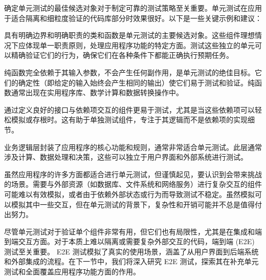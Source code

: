 确定单元测试的最佳候选对象对于制定可靠的测试策略至关重要。单元测试在应用于适合隔离和细粒度验证的代码库部分时效果很好。以下是一些关键示例和建议：

具有明确边界和明确职责的类和函数是单元测试的主要候选对象。这些组件理想情况下应体现单一职责原则，处理应用程序功能的特定方面。测试这些独立的单元可以精确验证它们的行为，确保它们在各种条件下都能正确执行预期任务。

纯函数完全依赖于其输入参数，不会产生任何副作用，是单元测试的绝佳目标。它们的确定性（即给定的输入始终会产生相同的输出）使它们易于测试和验证。纯函数通常出现在实用程序库、数学计算和数据转换操作中。

通过定义良好的接口与依赖项交互的组件更易于测试，尤其是当这些依赖项可以轻松模拟或存根时。这有助于单独测试组件，专注于其逻辑而不是依赖项的实现细节。

业务逻辑层封装了应用程序的核心功能和规则，通常非常适合单元测试。此层通常涉及计算、数据处理和决策，这些可以独立于用户界面和外部系统进行测试。

虽然应用程序的许多方面都适合进行单元测试，但谨慎起见，要认识到会带来挑战的场景。需要与外部资源（如数据库、文件系统和网络服务）进行复杂交互的组件可能难以有效模拟，或者由于依赖外部状态或行为而导致测试不稳定。虽然模拟可以模拟其中一些交互，但在单元测试的背景下，复杂性和开销可能并不总是值得付出努力。

尽管单元测试对于验证单个组件非常有用，但它们也有局限性，尤其是在集成和端到端交互方面。对于本质上难以隔离或需要复杂外部交互的代码，端到端 (E2E) 测试至关重要。 E2E 测试模拟了真实的使用场景，涵盖了从用户界面到后端系统和外部集成的流程。在下一节中，我们将深入研究 E2E 测试，探索其在补充单元测试和全面覆盖应用程序功能方面的作用。












